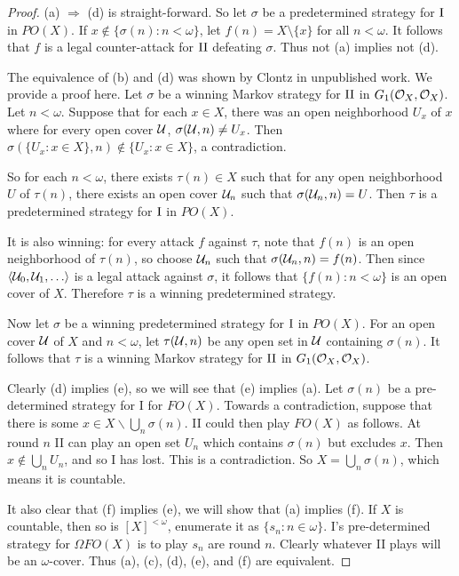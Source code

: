 \documentclass{amsart}
\theoremstyle{plain}
\theoremstyle{definition}
\theoremstyle{remark}
\theoremstyle{plain}
\theoremstyle{definition}
\theoremstyle{remark}
\begin{document}
\begin{proof}
 (a) \(\Rightarrow\) (d) is straight-forward. 
 So let \(\sigma\) be a predetermined strategy for \(\mathrm{I}\) in \(PO(X)\). 
 If \(x\not\in\{\sigma(n):n<\omega\}\), let \(f(n)=X\setminus\{x\}\) for all \(n<\omega\). It follows that \(f\) is a legal counter-attack for \(\mathrm{II}\) defeating \(\sigma\). 
 Thus not (a) implies not (d).

 The equivalence of (b) and (d) was shown by Clontz in unpublished work.
 We provide a proof here.
 Let \(\sigma\) be a winning Markov strategy for \(\mathrm{II}\) in \(G_1(\mathcal{O}_{X},\mathcal{O}_{X})\).
 Let \(n<\omega\). Suppose that for each \(x\in X\), there was an open neighborhood \(U_x\) of \(x\) where for every open cover \(\mathcal{U}\), \(\sigma(\mathcal{U},n)\not=U_x\). 
 Then \(\sigma(\{U_x : x\in X\},n)\not\in\{U_x:x\in X\}\), a contradiction.

 So for each \(n<\omega\), there exists \(\tau(n)\in X\) such that for any open neighborhood \(U\) of \(\tau(n)\), there exists an open cover \(\mathcal{U}_n\) such that \(\sigma(\mathcal{U}_n,n)=U\). 
 Then \(\tau\) is a predetermined strategy for \(\mathrm{I}\) in \(PO(X)\).

 It is also winning: for every attack \(f\) against \(\tau\), note that \(f(n)\) is an open neighborhood of \(\tau(n)\), so choose \(\mathcal{U}_n\) such that \(\sigma(\mathcal{U}_n,n)=f(n)\). 
 Then since \(\<\mc U_0,\mc U_1,\dots\>\) is a legal attack against \(\sigma\), it follows that \(\{f(n):n<\omega\}\) is an open cover of \(X\). 
 Therefore \(\tau\) is a winning predetermined strategy.

 Now let \(\sigma\) be a winning predetermined strategy for \(\mathrm{I}\) in \(PO(X)\). 
 For an open cover \(\mathcal{U}\) of \(X\) and \(n<\omega\), let \(\tau(\mathcal{U},n)\) be any open set in \(\mathcal{U}\) containing \(\sigma(n)\). 
 It follows that \(\tau\) is a winning Markov strategy for \(\mathrm{II}\) in \(G_1(\mathcal{O}_{X},\mathcal{O}_{X})\).

 Clearly (d) implies (e), so we will see that (e) implies (a). 
 Let \(\sigma(n)\) be a pre-determined strategy for I for \(FO(X)\). 
 Towards a contradiction, suppose that there is some \(x \in X \smallsetminus \bigcup_n \sigma(n)\).
 II could then play \(FO(X)\) as follows.
 At round \(n\) II can play an open set \(U_n\) which contains \(\sigma(n)\) but excludes \(x\).
 Then \(x \notin \bigcup_n U_n\), and so I has lost.
 This is a contradiction.
 So \(X = \bigcup_n \sigma(n)\), which means it is countable.

 It also clear that (f) implies (e), we will show that (a) implies (f).
 If \(X\) is countable, then so is \([X]^{<\omega}\), enumerate it as \(\{s_n : n \in \omega\}\).
 I's pre-determined strategy for \(\Omega FO(X)\) is to play \(s_n\) are round \(n\).
 Clearly whatever II plays will be an \(\omega\)-cover.
 Thus (a), (c), (d), (e), and (f) are equivalent.


\end{proof}
\end{document}
